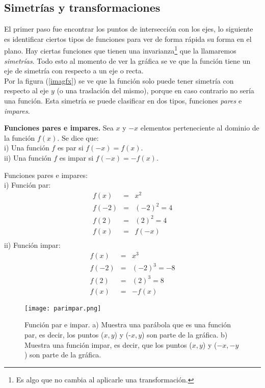 \subsection{Simetrías y transformaciones }
El primer paso fue encontrar los puntos de intersección con los ejes, lo siguiente es identificar ciertos tipos de funciones para ver de forma rápida su forma en el plano. Hay ciertas funciones que tienen una invarianza\footnote{Es algo que no cambia al aplicarle una transformación.} que la llamaremos \textit{simetrías}. Todo esto al momento de ver la gráfica se ve que la función tiene un eje de simetría con respecto a un eje o recta.\\
Por la figura (\ref{imagfx}) se ve que la función solo puede tener simetría con respecto al eje $y$ (o una traslación del mismo), porque en caso contrario no sería una función. Esta simetría se puede clasificar en dos tipos, funciones \textit{pares} e \textit{impares}.
\begin{mydef}
\textbf{Funciones pares e impares.} Sea $x$ y $-x$ elementos perteneciente al dominio de la función $f(x)$. Se dice que:\\
\noindent i) Una función $f$ es par si $f(-x)=f(x)$.\\
\noindent ii) Una función $f$ es impar si $f(-x)=-f(x)$.\\
\end{mydef}


\begin{myexample}
Funciones pares e impares:\\

\noindent i) Función par:\\
\begin{eqnarray*}
f(x)&=&x^{2}\\
f(-2)&=&(-2)^{2}=4\\
f(2)&=&(2)^{2}=4\\
f(x)&=&f(-x)\\
\end{eqnarray*}
\noindent ii) Función impar:\\
\begin{eqnarray*}
f(x)&=&x^{3}\\
f(-2)&=&(-2)^{3}=-8\\
f(2)&=&(2)^{3}=8\\
f(x)&=&-f(x)
\end{eqnarray*}
\end{myexample}

\begin{center}
\begin{figure}[h!]
\centering
\texttt{[image: parimpar.png]}
\caption[Función par e impar.]{Función par e impar. a) Muestra una parábola que es una función par, es decir, los puntos ($x,y$) y (-$x,y$) son parte de la gráfica. b) Muestra una función impar, es decir, que los puntos ($x,y$) y ($-x,-y$) son parte de la gráfica.}
\label{parimparfx}
\end{figure}
\end{center}

